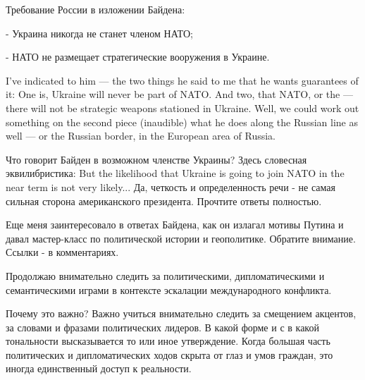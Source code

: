 Требование России в изложении Байдена: 

- Украина никогда не станет членом НАТО;

- НАТО не размещает стратегические вооружения в Украине. 

I’ve indicated to him — the two things he said to me that he wants guarantees
of it: One is, Ukraine will never be part of NATO.  And two, that NATO, or the
— there will not be strategic weapons stationed in Ukraine.  Well, we could
work out something on the second piece (inaudible) what he does along the
Russian line as well — or the Russian border, in the European area of Russia.

Что говорит Байден в возможном членстве Украины? Здесь словесная
эквилибристика: But the likelihood that Ukraine is going to join NATO in the
near term is not very likely... Да, четкость и определенность речи - не самая
сильная сторона американского президента. Прочтите ответы полностью. 

Еще меня заинтересовало в ответах Байдена, как он излагал мотивы Путина и давал
мастер-класс по политической истории и геополитике. Обратите внимание. Ссылки -
в комментариях. 

Продолжаю внимательно следить за политическими, дипломатическими и
семантическими играми в контексте эскалации международного конфликта. 

Почему это важно? Важно учиться внимательно следить за смещением акцентов, за
словами и фразами политических лидеров. В какой форме и с в какой тональности
высказывается то или иное утверждение. Когда большая часть политических и
дипломатических ходов скрыта от глаз и умов граждан, это иногда единственный
доступ к реальности.

